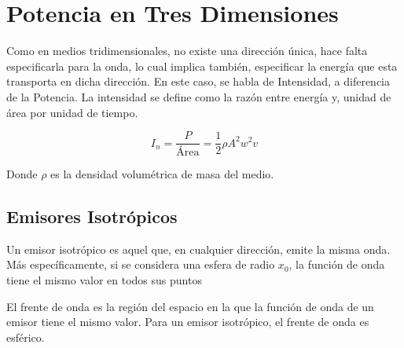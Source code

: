 \section{Potencia en Tres Dimensiones}

Como en medios tridimensionales, no existe una dirección única, hace
falta especificarla para la onda, lo cual implica también, especificar
la energía que esta transporta en dicha dirección. En este caso, se
habla de Intensidad, a diferencia de la Potencia. La intensidad se
define como la razón entre energía y, unidad de área por unidad de
tiempo.



\[I_n = \frac{P}{\text{Área}} = \frac{1}{2}\rho A^2 w^2 v\]

Donde $\rho$ es la densidad volumétrica de masa del medio.

\subsection{Emisores Isotrópicos}

Un emisor isotrópico es aquel que, en cualquier dirección, emite la
misma onda. Más específicamente, si se considera una esfera de radio
$x_0$, la función de onda tiene el mismo valor en todos sus puntos

El frente de onda es la región del espacio en la que la función de onda
de un emisor tiene el mismo valor. Para un emisor isotrópico, el frente
de onda es esférico.